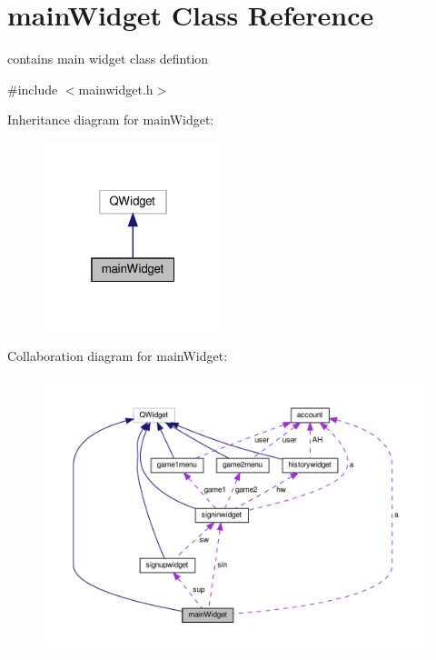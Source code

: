 \hypertarget{classmainWidget}{}\section{main\+Widget Class Reference}
\label{classmainWidget}


contains main widget class defintion  




{\ttfamily \#include $<$mainwidget.\+h$>$}



Inheritance diagram for main\+Widget\+:\nopagebreak
\begin{figure}[H]
\begin{center}
\leavevmode
\includegraphics[width=148pt]{classmainWidget__inherit__graph}
\end{center}
\end{figure}


Collaboration diagram for main\+Widget\+:\nopagebreak
\begin{figure}[H]
\begin{center}
\leavevmode
\includegraphics[width=350pt]{classmainWidget__coll__graph}
\end{center}
\end{figure}
